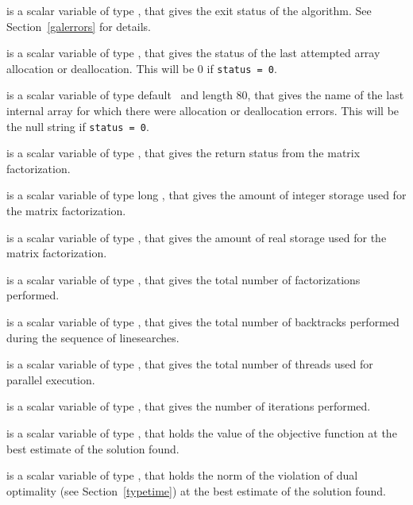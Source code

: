 \begin{description}

 is a scalar variable of type \integer, that gives the
exit status of the algorithm.
See Section~\ref{galerrors}
for details.

 is a scalar variable of type \integer, that gives
the status of the last attempted array allocation or deallocation.
This will be 0 if {\tt status = 0}.

 is a scalar variable of type default \character\
and length 80, that  gives the name of the last internal array
for which there were allocation or deallocation errors.
This will be the null string if {\tt status = 0}.

 is a scalar variable of type \integer, that
gives the return status from the matrix factorization.

 is a scalar variable of type long
\integer, that gives the amount of integer storage used for the matrix
factorization.

 is a scalar variable of type \longinteger,
that gives the amount of real storage used for the matrix factorization.

 is a scalar variable of type \integer, that gives the
total number of factorizations performed.

 is a scalar variable of type \integer, that gives the
total number of backtracks performed during the sequence of linesearches.

 is a scalar variable of type \integer, that gives the
total number of threads used for parallel execution.

 is a scalar variable of type \integer, that
gives the number of iterations performed.

 is a scalar variable of type \realdp, that holds the
value of the objective function at the best estimate of the solution found.


 is a scalar variable of type \realdp,
that holds the norm of the violation of dual optimality
(see Section~\ref{typetime}) at the best estimate of the solution found.


\end{description}
